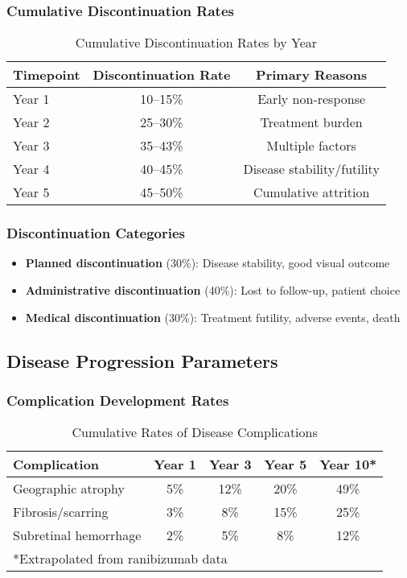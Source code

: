 \subsubsection{Cumulative Discontinuation Rates}
\begin{table}[h]
\centering
\caption{Cumulative Discontinuation Rates by Year}
\begin{tabular}{lcc}
\hline
Timepoint & Discontinuation Rate & Primary Reasons \\
\hline
Year 1 & 10--15\% & Early non-response \\
Year 2 & 25--30\% & Treatment burden \\
Year 3 & 35--43\% & Multiple factors \\
Year 4 & 40--45\% & Disease stability/futility \\
Year 5 & 45--50\% & Cumulative attrition \\
\hline
\end{tabular}
\end{table}

\subsubsection{Discontinuation Categories}
\begin{itemize}
    \item \textbf{Planned discontinuation} (30\%): Disease stability, good visual outcome
    \item \textbf{Administrative discontinuation} (40\%): Lost to follow-up, patient choice
    \item \textbf{Medical discontinuation} (30\%): Treatment futility, adverse events, death
\end{itemize}

\subsection{Disease Progression Parameters}

\subsubsection{Complication Development Rates}
\begin{table}[h]
\centering
\caption{Cumulative Rates of Disease Complications}
\begin{tabular}{lcccc}
\hline
Complication & Year 1 & Year 3 & Year 5 & Year 10* \\
\hline
Geographic atrophy & 5\% & 12\% & 20\% & 49\% \\
Fibrosis/scarring & 3\% & 8\% & 15\% & 25\% \\
Subretinal hemorrhage & 2\% & 5\% & 8\% & 12\% \\
\hline
\multicolumn{5}{l}{*Extrapolated from ranibizumab data} \\
\end{tabular}
\end{table}

